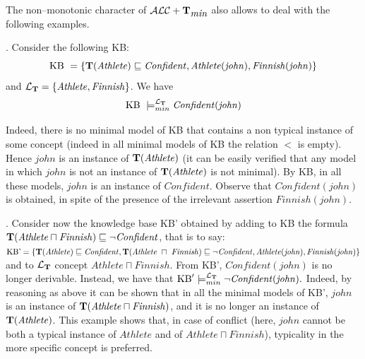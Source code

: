 \documentclass[a4paper, 11pt, oneside]{duthesis}
\newcommand{\tip}{{\bf T}}
\newcommand{\alctmin}{\mathcal{ALC}+\tip_{\mbox{\em min}}}
\newcommand{\sqset}{\sqsubseteq}
\newcommand{\mint}{\sqcap}
\newcommand{\ellet} {\mathcal{L}_{\bf T}}
\begin{document}
\noindent The non--monotonic character of $\alctmin$ also allows to deal with the following examples.

\vspace{0.5cm}


.
Consider the following KB:
$$\mbox{KB} \ = \{ \tip(\mathit{Athlete}) \sqset
\mathit{Confident}, \mathit{Athlete}(\mathit{john}),
\mathit{Finnish}(\mathit{john})\}$$ and ${\ellet}=
\{\mathit{Athlete}, \mathit{Finnish}\}$. We have $$\mbox{KB} \
\models_{min}^{\ellet} \mathit{Confident}(\mathit{john})$$

Indeed, there is no minimal model of KB that contains a non typical instance of some concept (indeed in all minimal models of KB the relation $<$ is empty).
Hence $\mathit{john}$ is an instance of $\tip(\mathit{Athlete})$
(it can be easily verified that any model in which $\mathit{john}$
is not an instance of $\tip(\mathit{Athlete})$ is not minimal).
By
KB, in all these models, $\mathit{john}$ is an instance of $\mathit{Confident}$.
Observe that $\mathit{Confident}(\mathit{john})$ is obtained, in spite of the presence of the irrelevant assertion $\mathit{Finnish}(\mathit{john})$.


\vspace{0.35cm}

. Consider now the knowledge base KB' obtained by adding to KB the formula $\tip(\mathit{Athlete} \mint \mathit{Finnish}) \sqsubseteq \neg \mathit{Confident}$, that is to say:
$\mbox{KB'}  = \{ \tip(\mathit{Athlete}) \sqset \mathit{Confident}, \tip(\mathit{Athlete} \ \mint \ \mathit{Finnish}) \sqsubseteq \neg \mathit{Confident}, \mathit{Athlete}(\mathit{john}), \mathit{Finnish}(\mathit{john})\}$ and to ${\ellet}$ concept $\mathit{Athlete} \mint \mathit{Finnish}$.
From KB', $\mathit{Confident}(\mathit{john})$ is no longer derivable.
Instead, we have that $\mbox{KB}' \models_{min}^{\ellet} \neg \mathit{Confident}(\mathit{john}).$ Indeed, by reasoning as above it can be shown that in all the minimal models of KB', $\mathit{john}$ is an instance of $\tip(\mathit{Athlete} \mint \mathit{Finnish})$, and it is no longer an instance of $\tip(\mathit{Athlete})$.
This example shows that, in case of conflict (here, $\mathit{john}$ cannot be both a typical instance of $\mathit{Athlete}$ and of $\mathit{Athlete} \mint \mathit{Finnish}$), typicality in the more specific concept is preferred.

\end{document}
